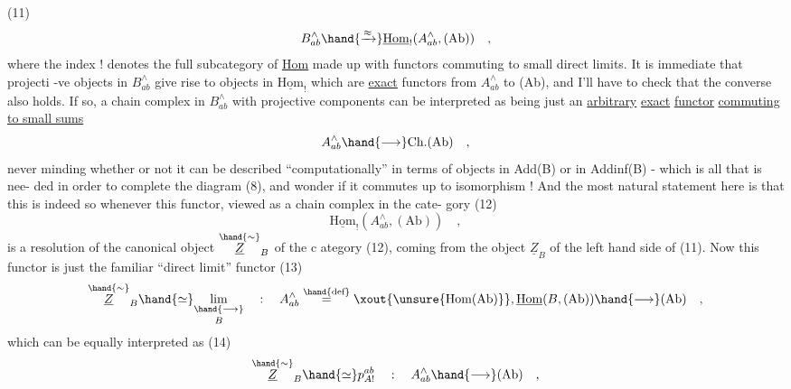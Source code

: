 
(11) \[ B^{\wedge}_{ab} \hand{\xrightarrow{\approx}} \underline{\text{Hom}}_{!}(A^{\wedge}_{ab}, (\text{Ab})) \quad , \]
where the index ! denotes the full subcategory of \uline{Hom} made up with
functors commuting to small direct limits. It is immediate that projecti
-ve objects in $B^{\wedge}_{ab}$ give rise to  objects in $\underline{\text{Hom}}_{!}$ which are \uline{exact}
functors from $A^{\wedge}_{ab}$ to (Ab), and I'll have to check that the converse
also holds. If so, a  chain complex in $B^{\wedge}_{ab}$ with projective
components can be interpreted as being just an  \uline{arbitrary} \uline{exact}
\uline{functor} \uline{commuting to small sums}
\[ A^{\wedge}_{ab} \hand{\longrightarrow} \text{Ch.}(\text{Ab}) \quad , \]
\hand{(}never minding whether or not it can be described ``computationally'' in
terms of objects in Add(B) or in Addinf(B)\unsure{\hand{!}}\hand{)} - which is all that is nee-%
ded in order to complete the diagram (8), and wonder if it commutes up
to isomorphism ! And the most natural statement here is that this is
indeed so whenever this functor, viewed as a chain complex in the  cate-%
gory
(12) \[ \underline{\text{Hom}}_{!}(A^{\wedge}_{ab},(\text{Ab})) \quad , \]
is a  resolution of the canonical object $\overset{\hand{\sim}}{\underline{Z}}_{B}$ of the c ategory (12), coming
from the object $\underline{Z}_{B}$ of the left hand side of (11). Now this functor is
just the  familiar ``direct limit'' functor
(13) \[ \overset{\hand{\sim}}{\underline{Z}}_{B} \hand{\simeq} \underset{B}{\underset{\hand{\longrightarrow}}{\text{lim}}} \quad : \quad A^{\wedge}_{ab} \overset{\hand{\text{def}}}{=} \xout{\unsure{\text{Hom}(\text{Ab})}},\underline{\text{Hom}}(B,(\text{Ab})) \hand{\longrightarrow} (\text{Ab}) \quad , \]
which can be equally interpreted as 
(14) \[ \overset{\hand{\sim}}{\underline{Z}}_{B} \hand{\simeq} p^{ab}_{A!} \quad : \quad A^{\wedge}_{ab} \hand{\longrightarrow} (\text{Ab}) \quad , \]

